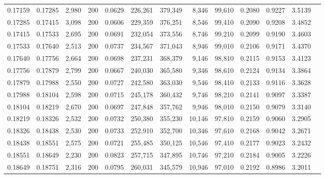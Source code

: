 \begin{tabular}{rrrrrrrrrrrrr}
0.17159 & 0.17285 &  2,980 & 200 &                                     0.0629 & 226,261 & 379,349 &   8,346 &  99,610 & 0.2080 & 0.9227 & 3.5139 \\
0.17285 & 0.17415 &  3,098 & 200 &                                     0.0606 & 229,359 & 376,251 &   8,546 &  99,410 & 0.2090 & 0.9208 & 3.4852 \\
0.17415 & 0.17533 &  2,695 & 200 &                                     0.0691 & 232,054 & 373,556 &   8,746 &  99,210 & 0.2099 & 0.9190 & 3.4603 \\
0.17533 & 0.17640 &  2,513 & 200 &                                     0.0737 & 234,567 & 371,043 &   8,946 &  99,010 & 0.2106 & 0.9171 & 3.4370 \\
0.17640 & 0.17756 &  2,664 & 200 &                                     0.0698 & 237,231 & 368,379 &   9,146 &  98,810 & 0.2115 & 0.9153 & 3.4123 \\
0.17756 & 0.17879 &  2,799 & 200 &                                     0.0667 & 240,030 & 365,580 &   9,346 &  98,610 & 0.2124 & 0.9134 & 3.3864 \\
0.17879 & 0.17988 &  2,550 & 200 &                                     0.0727 & 242,580 & 363,030 &   9,546 &  98,410 & 0.2133 & 0.9116 & 3.3628 \\
0.17988 & 0.18104 &  2,598 & 200 &                                     0.0715 & 245,178 & 360,432 &   9,746 &  98,210 & 0.2141 & 0.9097 & 3.3387 \\
0.18104 & 0.18219 &  2,670 & 200 &                                     0.0697 & 247,848 & 357,762 &   9,946 &  98,010 & 0.2150 & 0.9079 & 3.3140 \\
0.18219 & 0.18326 &  2,532 & 200 &                                     0.0732 & 250,380 & 355,230 &  10,146 &  97,810 & 0.2159 & 0.9060 & 3.2905 \\
0.18326 & 0.18438 &  2,530 & 200 &                                     0.0733 & 252,910 & 352,700 &  10,346 &  97,610 & 0.2168 & 0.9042 & 3.2671 \\
0.18438 & 0.18551 &  2,575 & 200 &                                     0.0721 & 255,485 & 350,125 &  10,546 &  97,410 & 0.2177 & 0.9023 & 3.2432 \\
0.18551 & 0.18649 &  2,230 & 200 &                                     0.0823 & 257,715 & 347,895 &  10,746 &  97,210 & 0.2184 & 0.9005 & 3.2226 \\
0.18649 & 0.18751 &  2,316 & 200 &                                     0.0795 & 260,031 & 345,579 &  10,946 &  97,010 & 0.2192 & 0.8986 & 3.2011 \\

\end{tabular}
